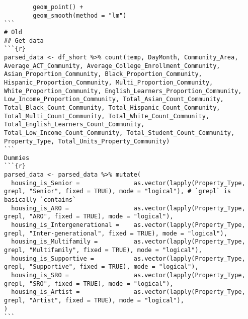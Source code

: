 \documentclass{article}
\begin{document}
\begin{verbatim}
        geom_point() +
        geom_smooth(method = "lm")
```
# Old
## Get data
```{r}
parsed_data <- df_short %>% count(temp, DayMonth, Community_Area, Average_ACT_Community, Average_College_Enrollment_Community, Asian_Proportion_Community, Black_Proportion_Community, Hispanic_Proportion_Community, Multi_Proportion_Community, White_Proportion_Community, English_Learners_Proportion_Community, Low_Income_Proportion_Community, Total_Asian_Count_Community, Total_Black_Count_Community, Total_Hispanic_Count_Community, Total_Multi_Count_Community, Total_White_Count_Community, Total_English_Learners_Count_Community, Total_Low_Income_Count_Community, Total_Student_Count_Community, Property_Type, Total_Units_Property_Community)
```
Dummies
```{r}
parsed_data <- parsed_data %>% mutate(
  housing_is_Senior =               as.vector(lapply(Property_Type, grepl, "Senior", fixed = TRUE), mode = "logical"), # `grepl` is basically `contains`
  housing_is_ARO =                  as.vector(lapply(Property_Type, grepl, "ARO", fixed = TRUE), mode = "logical"),
  housing_is_Intergenerational =    as.vector(lapply(Property_Type, grepl, "Inter-generational", fixed = TRUE), mode = "logical"),
  housing_is_Multifamily =          as.vector(lapply(Property_Type, grepl, "Multifamily", fixed = TRUE), mode = "logical"),
  housing_is_Supportive =           as.vector(lapply(Property_Type, grepl, "Supportive", fixed = TRUE), mode = "logical"),
  housing_is_SRO =                  as.vector(lapply(Property_Type, grepl, "SRO", fixed = TRUE), mode = "logical"),
  housing_is_Artist =               as.vector(lapply(Property_Type, grepl, "Artist", fixed = TRUE), mode = "logical"),
)
```


\end{verbatim}
\end{document}

